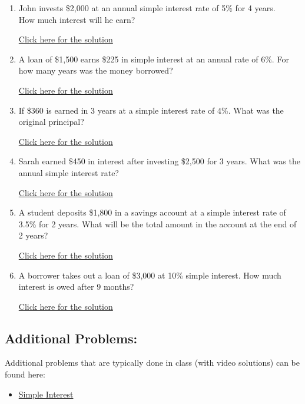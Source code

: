\documentclass[
]{book}
\providecommand{\tightlist}{%
  \setlength{\itemsep}{0pt}\setlength{\parskip}{0pt}}
\begin{document}
\begin{enumerate}
\def\labelenumi{\arabic{enumi}.}
\tightlist
\item
  John invests \$2,000 at an annual simple interest rate of 5\% for 4 years.\\
  How much interest will he earn?

  \href{https://youtu.be/BuhohsmwhBI}{Click here for the solution}
\item
  A loan of \$1,500 earns \$225 in simple interest at an annual rate of 6\%. For how many years was the money borrowed?

  \href{https://youtu.be/lRpx_TdHt-w}{Click here for the solution}
\item
  If \$360 is earned in 3 years at a simple interest rate of 4\%. What was the original principal?

  \href{https://youtu.be/crzQqex-stg}{Click here for the solution}
\item
  Sarah earned \$450 in interest after investing \$2,500 for 3 years. What was the annual simple interest rate?

  \href{https://youtu.be/vG7-oWsfi7g}{Click here for the solution}
\item
  A student deposits \$1,800 in a savings account at a simple interest rate of 3.5\% for 2 years. What will be the total amount in the account at the end of 2 years?

  \href{https://youtu.be/_ULZWLLe1v8}{Click here for the solution}
\item
  A borrower takes out a loan of \$3,000 at 10\% simple interest. How much interest is owed after 9 months?

  \href{https://youtu.be/cr8Rm5gLASA}{Click here for the solution}
\end{enumerate}

\subsection*{Additional Problems:}\label{additional-problems-6}

Additional problems that are typically done in class (with video solutions) can be found here:

\begin{itemize}
\tightlist
\item
  \href{https://theelementsmath.github.io/M114/simple-interest.html\#simple-interest-1}{Simple Interest}
\end{itemize}
\end{document}

